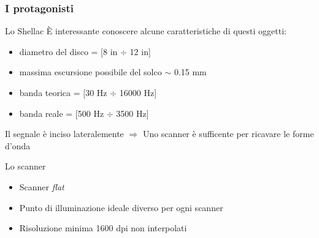 \begin{frame}

\frametitle{I protagonisti}

\begin{block}{Lo Shellac}
\`E interessante conoscere alcune caratteristiche di questi oggetti:
\begin{itemize}
\item diametro del disco = [8 in $\div$ 12 in]
\item massima escursione possibile del solco $\sim$ 0.15 mm
\item banda teorica = [30 Hz $\div$ 16000 Hz]
\item banda reale = [500 Hz $\div$ 3500 Hz] 
\end{itemize}
Il segnale è inciso lateralemente $\Rightarrow$ Uno scanner è 
sufficente per ricavare le forme d'onda
\end{block}

\begin{block}{Lo scanner}
\begin{itemize}
\item Scanner \emph{flat}
\item Punto di illuminazione ideale diverso per ogni scanner
\item Risoluzione minima 1600 dpi non interpolati
\end{itemize}
\end{block}

\end{frame}


